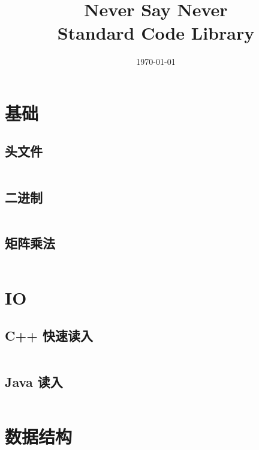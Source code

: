 \documentclass[titlepage,landscape,a4paper,10pt]{article}
\title{\LARGE{Never Say Never} \\[2ex] \Large{Standard Code Library} }
\date{\today}
\begin{document}
\maketitle

\begin{multicols*}{2}

\begin{spacing}{0}
	\tableofcontents
\end{spacing}
\end{multicols*}

\begin{multicols}{2}

\newpage
\begin{spacing}{0.8}

\section{基础}

\subsection{头文件}
\inputminted{cpp}{Basic/headers.cpp}

\subsection{二进制}
\inputminted{cpp}{Basic/binary.cpp}

\subsection{矩阵乘法}
\inputminted{cpp}{Basic/Matrix.cpp}



\section{IO}

\subsection{C++ 快速读入}
\inputminted{cpp}{IO/fastio.cpp}

\subsection{Java 读入}
\inputminted{java}{IO/Main.java}

\section{数据结构}


\end{spacing}
\end{multicols}
\end{document}
